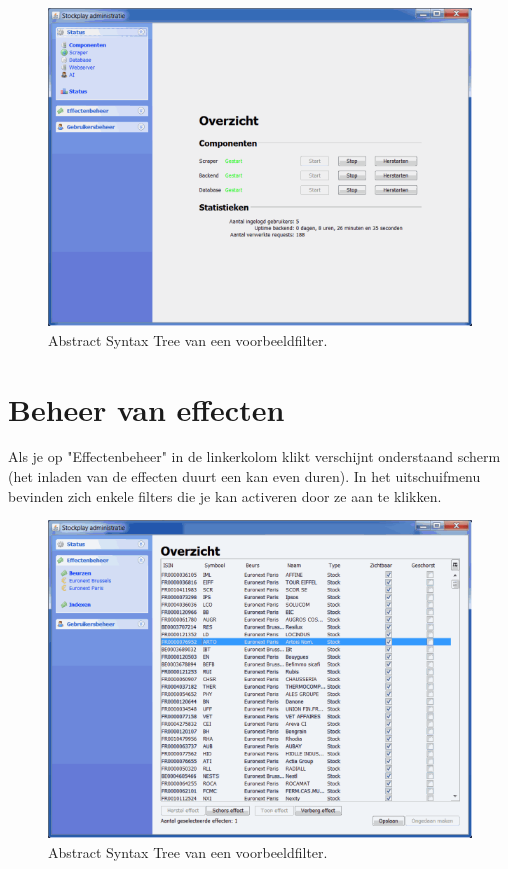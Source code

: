 \begin{figure}[h!]
	\centering
		\includegraphics[width=\textwidth]{images/handleiding/handleiding7.png}
	\caption{Abstract Syntax Tree van een voorbeeldfilter.}
\end{figure}

\section{Beheer van effecten}

Als je op "Effectenbeheer" in de linkerkolom klikt verschijnt onderstaand scherm (het inladen van de effecten duurt een kan even duren).
In het uitschuifmenu bevinden zich enkele filters die je kan activeren door ze aan te klikken.

\begin{figure}[h!]
	\centering
		\includegraphics[width=\textwidth]{images/handleiding/handleiding6.png}
	\caption{Abstract Syntax Tree van een voorbeeldfilter.}
\end{figure}

